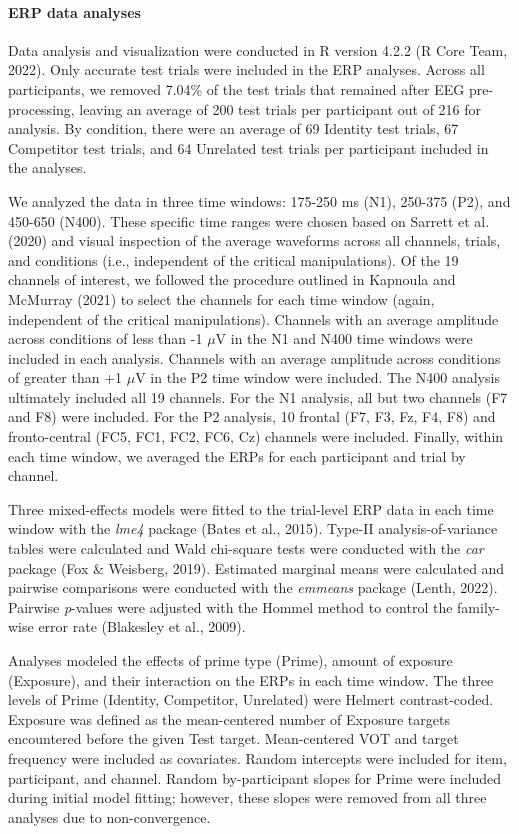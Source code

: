 \documentclass[
  12pt,
  twoside]{article}
\begin{document}
\hypertarget{methods-erp}{%
\paragraph{ERP data analyses}\label{methods-erp}}

Data analysis and visualization were conducted in R version 4.2.2 (R Core Team, 2022).
Only accurate test trials were included in the ERP analyses.
Across all participants, we removed 7.04\% of the test trials that remained after EEG pre-processing, leaving an average of 200 test trials per participant out of 216 for analysis.
By condition, there were an average of 69 Identity test trials, 67 Competitor test trials, and 64 Unrelated test trials per participant included in the analyses.

We analyzed the data in three time windows: 175-250 ms (N1), 250-375 (P2), and 450-650 (N400).
These specific time ranges were chosen based on Sarrett et al. (2020) and visual inspection of the average waveforms across all channels, trials, and conditions (i.e., independent of the critical manipulations).
Of the 19 channels of interest, we followed the procedure outlined in Kapnoula and McMurray (2021) to select the channels for each time window (again, independent of the critical manipulations).
Channels with an average amplitude across conditions of less than -1 \(\mu\)V in the N1 and N400 time windows were included in each analysis.
Channels with an average amplitude across conditions of greater than +1 \(\mu\)V in the P2 time window were included.
The N400 analysis ultimately included all 19 channels.
For the N1 analysis, all but two channels (F7 and F8) were included.
For the P2 analysis, 10 frontal (F7, F3, Fz, F4, F8) and fronto-central (FC5, FC1, FC2, FC6, Cz) channels were included.
Finally, within each time window, we averaged the ERPs for each participant and trial by channel.

Three mixed-effects models were fitted to the trial-level ERP data in each time window with the \emph{lme4} package (Bates et al., 2015).
Type-II analysis-of-variance tables were calculated and Wald chi-square tests were conducted with the \emph{car} package (Fox \& Weisberg, 2019).
Estimated marginal means were calculated and pairwise comparisons were conducted with the \emph{emmeans} package (Lenth, 2022).
Pairwise \emph{p}-values were adjusted with the Hommel method to control the family-wise error rate (Blakesley et al., 2009).

Analyses modeled the effects of prime type (Prime), amount of exposure (Exposure), and their interaction on the ERPs in each time window.
The three levels of Prime (Identity, Competitor, Unrelated) were Helmert contrast-coded.
Exposure was defined as the mean-centered number of Exposure targets encountered before the given Test target.
Mean-centered VOT and target frequency were included as covariates.
Random intercepts were included for item, participant, and channel.
Random by-participant slopes for Prime were included during initial model fitting; however, these slopes were removed from all three analyses due to non-convergence.
\end{document}
